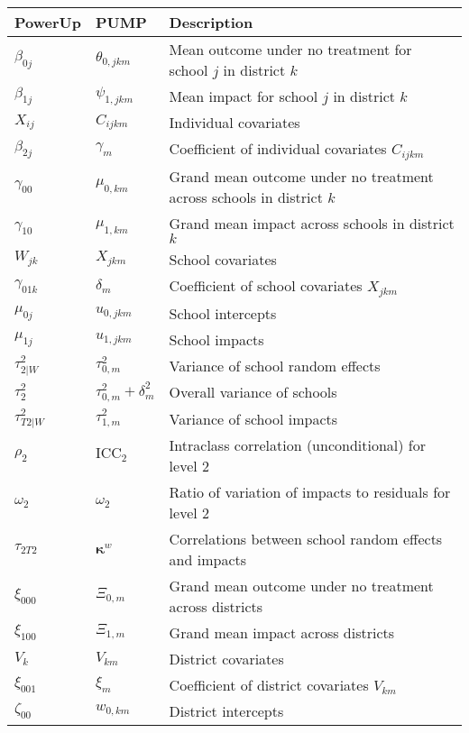 \documentclass[12pt]{article}
\begin{document}
\begin{table}[p]
\begin{tabular}{l | l | l}
PowerUp				& PUMP							& Description \\ \hline
$\beta_{0j}$		& $\theta_{0,jkm}$				& Mean outcome under no treatment for school $j$ in district $k$\\
$\beta_{1j}$		& $\psi_{1,jkm}$					& Mean impact for school $j$ in district $k$ \\ \hline
$X_{ij}$			& $C_{ijkm}$					& Individual covariates \\ 
$\beta_{2j}$		& $\gamma_{m}$					& Coefficient of individual covariates $C_{ijkm}$ \\ \hline
$\gamma_{00}$		& $\mu_{0,km}$					& Grand mean outcome under no treatment across schools in district $k$ \\
$\gamma_{10}$		& $\mu_{1,km}$					& Grand mean impact across schools in district $k$\\
$W_{jk}$			& $X_{jkm}$						& School covariates \\
$\gamma_{01k}$		& $\delta_{m}$					& Coefficient of school covariates $X_{jkm}$ \\
$\mu_{0j}$			& $u_{0,jkm}$					& School intercepts\\
$\mu_{1j}$			& $u_{1,jkm}$					& School impacts\\
$\tau^2_{2|W}$		& $\tau^2_{0,m}$					& Variance of school random effects \\
$\tau^2_{2}$		& $\tau^2_{0,m} + \delta_{m}^2$	& Overall variance of schools \\
$\tau^2_{T2|W}$		& $\tau^2_{1,m}$					& Variance of school impacts \\
$\rho_2$			& $\text{ICC}_2$					& Intraclass correlation (unconditional) for level 2 \\
$\omega_2$			& $\omega_2$					& Ratio of variation of impacts to residuals	 for level 2 \\
$\tau_{2T2}$		& $\boldsymbol{\kappa}^{w}$ 		& Correlations between school random effects and impacts \\ \hline
$\xi_{000}$			& $\Xi_{0,m}$ 					& Grand mean outcome under no treatment across districts \\
$\xi_{100}$			& $\Xi_{1,m}$ 					& Grand mean impact across districts\\
$V_{k}$				& $V_{km}$						& District covariates \\
$\xi_{001}$			& $\xi_{m}$						& Coefficient of district covariates $V_{km}$ \\
$\zeta_{00}$		& $w_{0,km}$					& District intercepts\\

\end{tabular}
\end{table}
\end{document}
